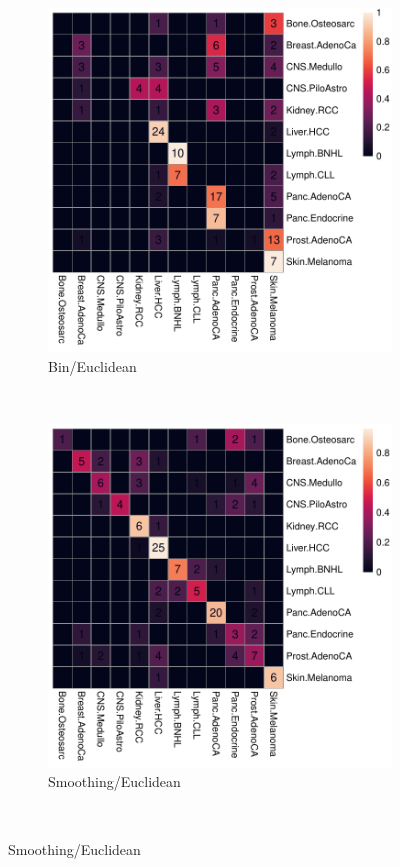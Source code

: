 \begin{figure}[htbp]
    \begin{subfigure}{.5\textwidth}
    \includegraphics[scale=0.6]{graphics/confustion_matrix_bins_euclidean.pdf}
    \caption{Bin/Euclidean}
    \label{fig:confusion_bin_euclidean}
    \end{subfigure}
    ~
    \begin{subfigure}{.5\textwidth}
    
    \includegraphics[scale=0.6]{graphics/confustion_matrix_smooth_euclidean.pdf}
    \caption{Smoothing/Euclidean}
    \label{fig:confusion_smooth_euclidean}
    \end{subfigure} \\
    \vspace{0.5cm}
    

\end{figure}
